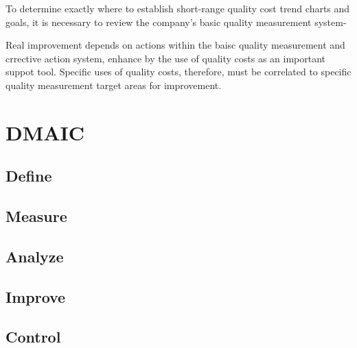 \documentclass[11pt]{article}
\begin{document}
To determine exactly where to establish short-range quality cost trend
charts and goals, it is necessary to review the company's basic quality
measurement system-

Real improvement depends on actions within the baisc quality measurement
and crrective action system, enhance by the use of quality costs as an
important suppot tool. Specific uses of quality costs, therefore, must
be correlated to specific quality measurement target areas for
improvement.

    \hypertarget{dmaic}{%
\section{DMAIC}\label{dmaic}}

\hypertarget{define}{%
\subsection{Define}\label{define}}

\hypertarget{measure}{%
\subsection{Measure}\label{measure}}

\hypertarget{analyze}{%
\subsection{Analyze}\label{analyze}}

\hypertarget{improve}{%
\subsection{Improve}\label{improve}}

\hypertarget{control}{%
\subsection{Control}\label{control}}


    
    
    
\end{document}

